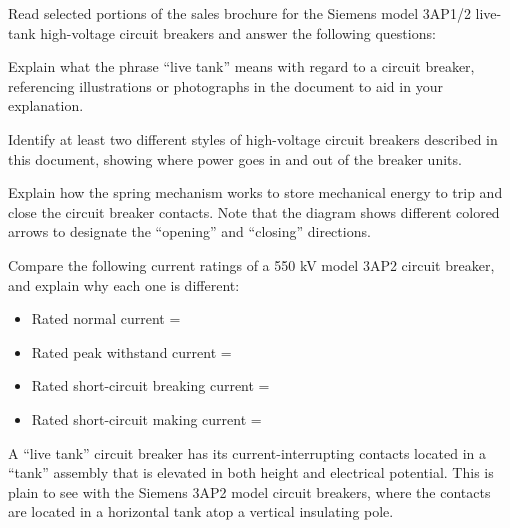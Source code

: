 

Read selected portions of the sales brochure for the Siemens model 3AP1/2 live-tank high-voltage circuit breakers and answer the following questions:

\vskip 10pt

Explain what the phrase ``live tank'' means with regard to a circuit breaker, referencing illustrations or photographs in the document to aid in your explanation.

\vskip 10pt

Identify at least two different styles of high-voltage circuit breakers described in this document, showing where power goes in and out of the breaker units.

\vskip 10pt

Explain how the spring mechanism works to store mechanical energy to trip and close the circuit breaker contacts.  Note that the diagram shows different colored arrows to designate the ``opening'' and ``closing'' directions.

\vskip 10pt

Compare the following current ratings of a 550 kV model 3AP2 circuit breaker, and explain why each one is different:

\begin{itemize}
\item{} Rated normal current = \underbar{\hskip 50pt}
\vskip 5pt
\item{} Rated peak withstand current = \underbar{\hskip 50pt}
\vskip 5pt
\item{} Rated short-circuit breaking current = \underbar{\hskip 50pt}
\vskip 5pt
\item{} Rated short-circuit making current = \underbar{\hskip 50pt}
\end{itemize}

\vskip 10pt







 






A ``live tank'' circuit breaker has its current-interrupting contacts located in a ``tank'' assembly that is elevated in both height and electrical potential.  This is plain to see with the Siemens 3AP2 model circuit breakers, where the contacts are located in a horizontal tank atop a vertical insulating pole.

